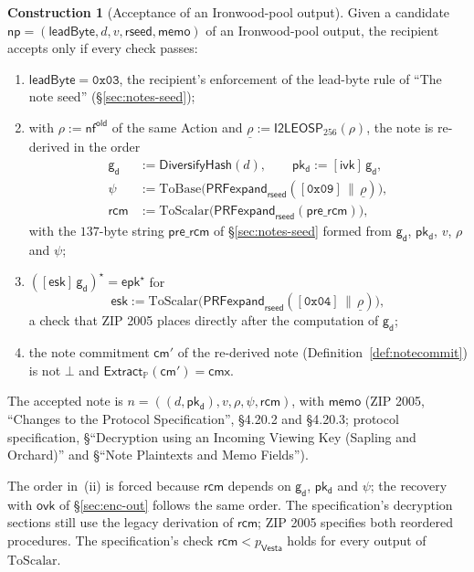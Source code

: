 \documentclass[11pt,a4paper]{article}
\theoremstyle{definition}
\newtheorem{construction}[theorem]{Construction}
\newcommand{\PP}{\mathbb{P}}
\newcommand{\nfsym}{\mathsf{nf}}
\newcommand{\cmsym}{\mathsf{cm}}
\newcommand{\cmx}{\mathsf{cmx}}
\newcommand{\Vesta}{\ensuremath{\mathsf{Vesta}}}
\newcommand{\Extract}{\ensuremath{\mathsf{Extract}}}
\newcommand{\ivk}{\ensuremath{\mathsf{ivk}}}
\newcommand{\ovk}{\ensuremath{\mathsf{ovk}}}
\newcommand{\pkd}{\ensuremath{\mathsf{pk_d}}}
\newcommand{\gd}{\ensuremath{\mathsf{g_d}}}
\newcommand{\rcm}{\ensuremath{\mathsf{rcm}}}
\begin{document}
\begin{construction}[Acceptance of an Ironwood-pool output]
Given a candidate $\mathsf{np} = (\mathsf{leadByte}, d, v, \mathsf{rseed},
\mathsf{memo})$ of an Ironwood-pool output, the recipient accepts only if
every check passes:
\begin{enumerate}[label=(\roman*)]
\item $\mathsf{leadByte} = \mathtt{0x03}$, the recipient's enforcement of the
  lead-byte rule of ``The note seed'' (\S\ref{sec:notes-seed});
\item with $\rho := \nfsym^{\mathsf{old}}$ of the same Action and
  $\underline{\rho} := \mathsf{I2LEOSP}_{256}(\rho)$, the note is re-derived
  in the order
  \begin{align*}
    \gd &:= \mathsf{DiversifyHash}(d), \qquad \pkd := [\ivk]\,\gd, \\
    \psi &:= \mathrm{ToBase}\bigl(\mathsf{PRFexpand}_{\mathsf{rseed}}
      ([\mathtt{0x09}] \,\|\, \underline{\rho})\bigr), \\
    \rcm &:= \mathrm{ToScalar}\bigl(\mathsf{PRFexpand}_{\mathsf{rseed}}
      (\mathsf{pre\_rcm})\bigr),
  \end{align*}
  with the $137$-byte string $\mathsf{pre\_rcm}$ of \S\ref{sec:notes-seed}
  formed from $\gd$, $\pkd$, $v$, $\rho$ and $\psi$;
\item $([\mathsf{esk}]\,\gd)^{\star} = \mathsf{epk}^{\star}$ for
  \[
    \mathsf{esk} := \mathrm{ToScalar}\bigl(\mathsf{PRFexpand}_{\mathsf{rseed}}
    ([\mathtt{0x04}] \,\|\, \underline{\rho})\bigr),
  \]
  a check that ZIP 2005 places directly after the computation of $\gd$;
\item the note commitment $\cmsym'$ of the re-derived note
  (Definition~\ref{def:notecommit}) is not $\bot$ and
  $\Extract_{\PP}(\cmsym') = \cmx$.
\end{enumerate}
The accepted note is $n = ((d, \pkd), v, \rho, \psi, \rcm)$, with
$\mathsf{memo}$ (ZIP 2005, ``Changes to the Protocol Specification'',
\S 4.20.2 and \S 4.20.3; protocol specification, \S``Decryption using an
Incoming Viewing Key (Sapling and Orchard)'' and \S``Note Plaintexts and Memo
Fields'').
\end{construction}

The order in~(ii) is forced because $\rcm$ depends on $\gd$, $\pkd$ and
$\psi$; the recovery with $\ovk$ of \S\ref{sec:enc-out} follows the same
order. The specification's decryption sections still use the legacy
derivation of $\rcm$; ZIP 2005 specifies both reordered procedures. The
specification's check $\rcm < p_{\Vesta}$ holds for every output of
$\mathrm{ToScalar}$.
\end{document}
